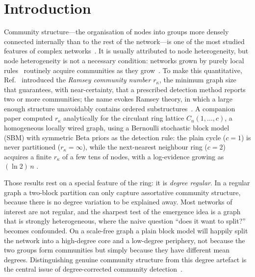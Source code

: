\documentclass[aps,pre,twocolumn,superscriptaddress,floatfix,nofootinbib]{revtex4-2}
\begin{document}
\section{Introduction}
\label{sec:intro}

Community structure---the organisation of nodes into groups more densely
connected internally than to the rest of the network---is one of the most
studied features of complex networks~\cite{girvan2002community,fortunato2010community,fortunato2016community}.
It is usually attributed to node heterogeneity, but node heterogeneity is not a
necessary condition: networks grown by purely local
rules~\cite{vazquez2003growing} routinely acquire communities as they
grow~\cite{vazquez2025ramsey}. To make this quantitative,
Ref.~\cite{vazquez2025ramsey} introduced the \emph{Ramsey community number}
$r_\kappa$, the minimum graph size that guarantees, with near-certainty, that a
prescribed detection method reports two or more communities; the name evokes
Ramsey theory, in which a large enough structure unavoidably contains ordered
substructures~\cite{ramsey1930problem}. A companion paper computed $r_\kappa$
analytically for the circulant ring lattice $C_n(1,\dots,c)$, a homogeneous
locally wired graph, using a Bernoulli stochastic block model (SBM) with
symmetric $\mathrm{Beta}$ priors as the detection rule: the plain cycle
($c=1$) is never partitioned ($r_\kappa=\infty$), while the next-nearest
neighbour ring ($c=2$) acquires a finite $r_\kappa$ of a few tens of nodes,
with a log-evidence growing as $(\ln 2)\,n$ \cite{vazquez2026ringwantsbroken}.

Those results rest on a special feature of the ring: it is
\emph{degree regular}. In a regular graph a two-block partition can only
capture assortative community structure, because there is no degree variation
to be explained away. Most networks of interest are not regular, and the
sharpest test of the emergence idea is a graph that is strongly heterogeneous,
where the naive question ``does it want to split?'' becomes confounded. On a
scale-free graph a plain block model will happily split the network into a
high-degree core and a low-degree periphery, not because the two groups form
communities but simply because they have different mean degrees. Distinguishing
genuine community structure from this degree artefact is the central issue of
degree-corrected community detection~\cite{karrer2011stochastic}.
\end{document}
